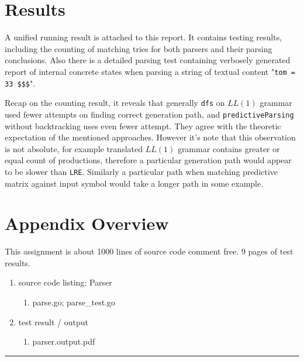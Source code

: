 \documentclass[%
 aip,
 jmp,%
 amsmath,amssymb,
 reprint,%
]{revtex4-1}
\begin{document}
\section{Results}
A unified running result is attached to this report. It contains testing results, including the counting of matching tries for both parsers and their parsing conclusions. Also there is a detailed parsing test containing verbosely generated report of internal concrete states when parsing a string of textual content "\texttt{tom = 33 \$\$\$}". 

Recap on the counting result, it reveals that generally \texttt{dfs} on $LL(1)$ grammar used fewer attempts on finding correct generation path, and \texttt{predictiveParsing} without backtracking uses even fewer attempt. They agree with the theoretic expectation of the mentioned approaches. However it's note that this observation is not absolute, for example translated $LL(1)$ grammar contains greater or equal count of productions, therefore a particular generation path would appear to be slower than \texttt{LRE}. Similarly a particular path when matching predictive matrix against input symbol would take a longer path in some example.
\section{Appendix Overview}
This assignment is about 1000 lines of source code comment free. 9 pages of test results. 


\begin{enumerate}[$\surd$]
	\item source code listing: Parser 
	\begin{enumerate}[$\blacktriangleright$]
	\item parse.go; parse\_test.go
	\end{enumerate}
	\item test result / output
	\begin{enumerate}[$\blacktriangleright$]
	\item parser.output.pdf
	\end{enumerate}
\end{enumerate}

\rule{\textwidth}{2pt}
\end{document}
